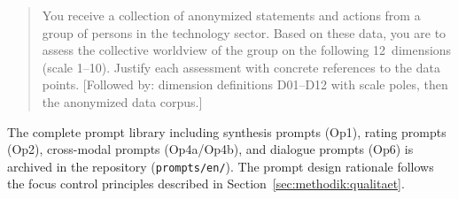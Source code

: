 \documentclass[12pt,a4paper]{article}
\begin{document}
\begin{quote}
\small\raggedright
You receive a collection of anonymized statements and actions from a group of persons in the technology sector. Based on these data, you are to assess the collective worldview of the group on the following 12~dimensions (scale 1--10). Justify each assessment with concrete references to the data points. [Followed by: dimension definitions D01--D12 with scale poles, then the anonymized data corpus.]
\end{quote}

\noindent The complete prompt library including synthesis prompts (Op1), rating prompts (Op2), cross-modal prompts (Op4a/Op4b), and dialogue prompts (Op6) is archived in the repository (\texttt{prompts/en/}). The prompt design rationale follows the focus control principles described in Section~\ref{sec:methodik:qualitaet}.
\end{document}
